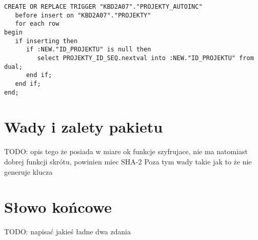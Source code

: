 \documentclass[12pt, a4paper]{article}
\begin{document}
\begin{lstlisting}
CREATE OR REPLACE TRIGGER "KBD2A07"."PROJEKTY_AUTOINC" 
   before insert on "KBD2A07"."PROJEKTY" 
   for each row 
begin  
   if inserting then 
      if :NEW."ID_PROJEKTU" is null then 
         select PROJEKTY_ID_SEQ.nextval into :NEW."ID_PROJEKTU" from dual; 
      end if; 
   end if; 
end;
\end{lstlisting}
  

\section{Wady i zalety pakietu}
TODO: opis tego że posiada w miare ok funkcje szyfrujace, nie ma natomiast
dobrej funkcji skrótu, powinien miec SHA-2
Poza tym wady takie jak to że nie generuje klucza 

\section{Słowo końcowe}
TODO: napisać jakieś ładne dwa zdania
\end{document}
